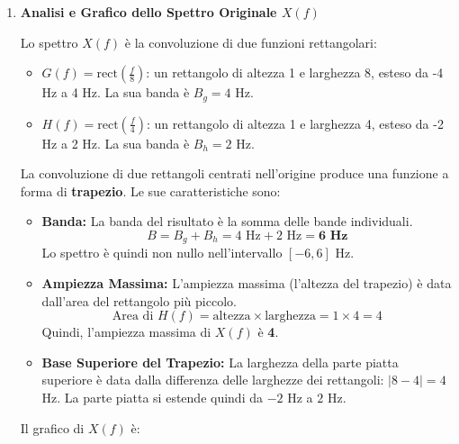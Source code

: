 
\begin{soluzione}{23}
    \begin{enumerate}
        \item \textbf{Analisi e Grafico dello Spettro Originale $X(f)$}
        
        Lo spettro $X(f)$ è la convoluzione di due funzioni rettangolari:
        \begin{itemize}
            \item $G(f) = \text{rect}\left(\frac{f}{8}\right)$: un rettangolo di altezza 1 e larghezza 8, esteso da -4 Hz a 4 Hz. La sua banda è $B_g = 4$ Hz.
            \item $H(f) = \text{rect}\left(\frac{f}{4}\right)$: un rettangolo di altezza 1 e larghezza 4, esteso da -2 Hz a 2 Hz. La sua banda è $B_h = 2$ Hz.
        \end{itemize}
        
        La convoluzione di due rettangoli centrati nell'origine produce una funzione a forma di \textbf{trapezio}. Le sue caratteristiche sono:
        \begin{itemize}
            \item \textbf{Banda:} La banda del risultato è la somma delle bande individuali.
            \[
                B = B_g + B_h = 4 \text{ Hz} + 2 \text{ Hz} = \mathbf{6 \text{ Hz}}
            \]
            Lo spettro è quindi non nullo nell'intervallo $[-6, 6]$ Hz.
            
            \item \textbf{Ampiezza Massima:} L'ampiezza massima (l'altezza del trapezio) è data dall'area del rettangolo più piccolo.
            \[
                \text{Area di } H(f) = \text{altezza} \times \text{larghezza} = 1 \times 4 = 4
            \]
            Quindi, l'ampiezza massima di $X(f)$ è \textbf{4}.
            
            \item \textbf{Base Superiore del Trapezio:} La larghezza della parte piatta superiore è data dalla differenza delle larghezze dei rettangoli: $|8 - 4| = 4$ Hz. La parte piatta si estende quindi da $-2$ Hz a $2$ Hz.
        \end{itemize}
        
        Il grafico di $X(f)$ è:
        \begin{center}
        \end{center}
        

\end{enumerate}
\end{soluzione}
